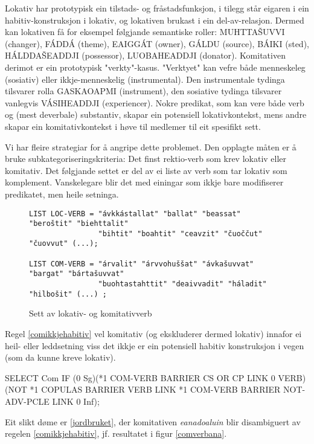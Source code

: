 \documentclass[a4paper,norsk]{article}
\begin{document}
Lokativ har prototypisk ein tilstads- og fråstadsfunksjon, i tilegg står eigaren i ein habitiv-konstruksjon i lokativ, og lokativen brukast i ein del-av-relasjon. Dermed kan lokativen få for eksempel følgjande semantiske roller: MUHTTAŠUVVI (changer), FÁDDÁ (theme), EAIGGÁT (owner), GÁLDU (source), BÁIKI (sted), HÁLDDAŠEADDJI (possessor), LUOBAHEADDJI (donator). Komitativen derimot er ein prototypisk "verkty"-kasus. "Verktyet" kan vefre både menneskeleg (sosiativ) eller ikkje-menneskelig (instrumental). Den instrumentale tydinga tilsvarer rolla GASKAOAPMI (instrument), den sosiative tydinga tilsvarer vanlegvis VÁSIHEADDJI (experiencer).
Nokre predikat, som kan vere både verb og (mest deverbale) substantiv, skapar ein potensiell lokativkontekst, mens andre skapar ein komitativkontekst i høve til medlemer til eit spesifikt sett.

Vi har fleire strategiar for å angripe dette problemet. Den opplagte måten er å bruke subkategoriseringskriteria: Det finst rektio-verb som krev lokativ eller komitativ. Det følgjande settet er del av ei liste av verb som tar lokativ som komplement. Vanskelegare blir det med einingar som ikkje bare modifiserer predikatet, men heile setninga. %

\begin{figure}[htbp]
\begin{center}
\begin{verbatim}
LIST LOC-VERB = "ávkkástallat" "ballat" "beassat" "beroštit" "biehttalit"
			 	"bihtit" "boahtit" "ceavzit" "čuoččut" "čuovvut" (...);
			 	
LIST COM-VERB = "árvalit" "árvvohuššat" "ávkašuvvat" "bargat" "bártašuvvat"
 				"buohtastahttit" "deaivvadit" "háladit" "hilbošit" (...) ;
\end{verbatim}
\caption{Sett av lokativ- og komitativverb}
\label{loccomverb}
\end{center}
\end{figure}

Regel \ref{comikkjehabitiv} vel komitativ (og ekskluderer dermed lokativ) innafor ei heil- eller leddsetning viss det ikkje er ein potensiell habitiv konstruksjon i vegen (som da kunne kreve lokativ). %

\begin{example}\label{comikkjehabitiv}
SELECT Com IF (0 Sg)(*1 COM-VERB BARRIER CS OR CP LINK 0 VERB)
	(NOT *1 COPULAS BARRIER VERB LINK *1 COM-VERB BARRIER NOT-ADV-PCLE 
	LINK 0 Inf);    
\end{example}

Eit slikt døme er \ref{jordbruket}, der komitativen \emph{eanadoaluin} blir disambiguert av regelen \ref{comikkjehabitiv}, jf. resultatet i figur \ref{comverbana}.%
\end{document}
